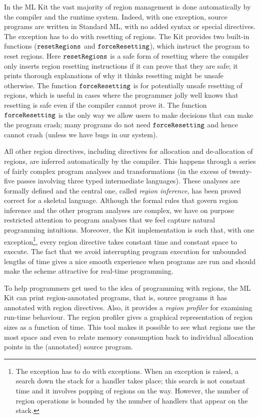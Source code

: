 \documentclass[12pt]{book}
\begin{document}
In the ML Kit the vast majority of region management is done
automatically by the compiler and the runtime system.  Indeed, with
one exception, source programs are written in Standard ML, with no
added syntax or special directives. The exception has to do with
resetting of regions. The Kit provides two built-in functions
($\hbox{\tt resetRegions}$ and $\hbox{\tt forceResetting}$), which instruct the
program to reset regions. Here $\hbox{\tt resetRegions}$ is a safe form of resetting
where the compiler only inserts region resetting instructions if it can prove
that they are safe; it prints thorough explanations of why it thinks
resetting might be unsafe otherwise. The function $\hbox{\tt forceResetting}$ is for potentially
unsafe resetting of regions, which is useful in cases where the
programmer jolly well knows that resetting is safe even if the
compiler cannot prove it. The function $\hbox{\tt forceResetting}$ is the only way we allow users to
make decisions that can make the program crash; many programs do not
need $\hbox{\tt forceResetting}$ and hence cannot crash (unless we have bugs in our
system).

All other region directives, including directives for
allocation and de-allocation of regions, are inferred automatically by
the compiler.  This happens through a series of fairly complex program
analyses and transformations (in the excess of twenty-five passes
involving three typed intermediate languages). These analyses are formally
defined and the central one, called 
%
{\em region inference}, has been proved correct for a skeletal
language. Although the formal rules that govern region inference and
the other program analyses are complex, we have on purpose restricted
attention to program analyses that we feel capture natural programming
intuitions.  Moreover, the Kit implementation is such that, with one
exception\footnote{The exception has to do with exceptions. When an
  exception is raised, a search down the stack for a handler takes
  place; this search is not constant time and it involves popping of
  regions on the way. However, the number of region operations is
  bounded by the number of handlers that appear on the stack.}, every
region directive takes constant time and constant space to execute.
The fact that we avoid interrupting program execution for unbounded
lengths of time gives a nice smooth experience when programs are run
and should make the scheme attractive for real-time programming.

To help programmers get used to the idea of programming with regions,
the ML Kit can print region-annotated programs, that is, source programs
it has annotated with region directives. Also, it provides a 
%
{\em region profiler\/} for examining run-time behaviour.  The region
profiler gives a graphical representation of region sizes as a
function of time. This tool makes it possible to see what regions use
the most space and even to relate memory consumption back to
individual allocation points in the (annotated) source program.
\end{document}
